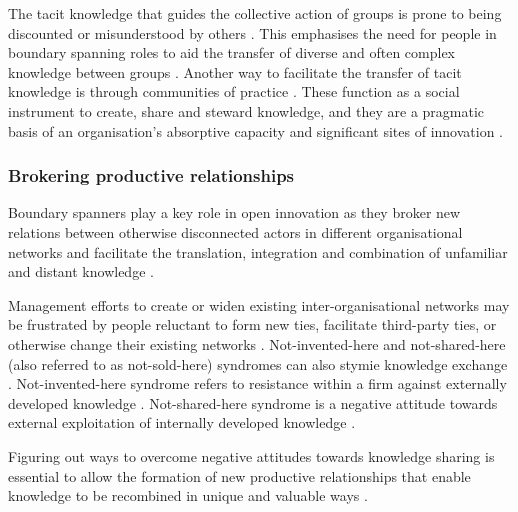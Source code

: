 The tacit knowledge that guides the collective action of groups is prone to being discounted or misunderstood by others \citep{burt2007secondhand}. This emphasises the need for people in boundary spanning roles to aid the transfer of diverse and often complex knowledge between groups \citep{tushman1981boundary,allen1984managing,szulanski2003sticky,seidler2008use,meyer2010rise,chesbrough2012open}. Another way to facilitate the transfer of tacit knowledge is through communities of practice \citep{lave1991situated,brown2001knowledge,smith2001role,cox2005communities,easterby2008inter}. These function as a social instrument to create, share and steward knowledge, and they are a pragmatic basis of an organisation’s absorptive capacity and significant sites of innovation \citep{brown1991organizational}. \medskip

\subsubsection{Brokering productive relationships}

Boundary spanners play a key role in open innovation as they broker new relations between otherwise disconnected actors in different organisational networks and facilitate the translation, integration and combination of unfamiliar and distant knowledge \citep{granovetter1973strength,tushman1981boundary,allen1984managing,szulanski2003sticky,burt2004structural,burt2007secondhand,seidler2008use,meyer2010rise,chesbrough2012open}. \medskip

Management efforts to create or widen existing inter-organisational networks may be frustrated by people reluctant to form new ties, facilitate third-party ties, or otherwise change their existing networks \citep{davis2010agency}. Not-invented-here and not-shared-here (also referred to as not-sold-here) syndromes can also stymie knowledge exchange \citep{lichtenthaler2006attitudes,lichtenthaler2011your,de2014neither,podmetina2015skills,chesbrough2017future}. Not-invented-here syndrome refers to resistance within a firm against externally developed knowledge \citep{katz1982investigating,hussinger2011search,antons2015opening}. Not-shared-here syndrome is a negative attitude towards external exploitation of internally developed knowledge \citep{chesbrough2003open,lichtenthaler2006attitudes,de2014neither}. \medskip

Figuring out ways to overcome negative attitudes towards knowledge sharing is essential to allow the formation of new productive relationships that enable knowledge to be recombined in unique and valuable ways \citep{uzzi1997social,nahapiet1998social,obstfeld2005social,lane2006reification,davis2010agency,meyer2010rise}.\medskip

